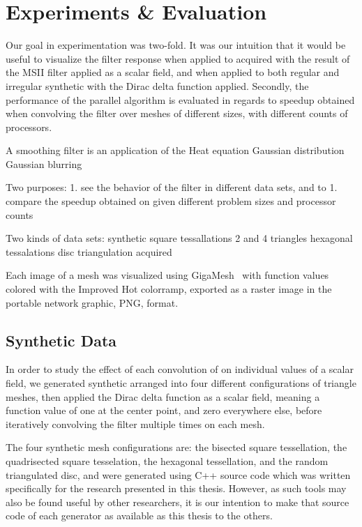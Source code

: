 \chapter{Experiments \& Evaluation}
Our goal in experimentation was two-fold. It was our intuition that it would be useful to visualize the filter response when applied to acquired \tdd{} with the result of the MSII filter applied as a scalar field, and when applied to both regular and irregular synthetic \tdd{} with the Dirac delta function applied. Secondly, the performance of the parallel algorithm is evaluated in regards to speedup obtained when convolving the filter over meshes of different sizes, with different counts of processors.

A smoothing filter is an application of the Heat equation 
Gaussian distribution
Gaussian blurring

Two purposes:
	1. see the behavior of the filter in different data sets, and to
	1. compare the speedup obtained on given different problem sizes and processor counts

Two kinds of data sets:
	synthetic
		square tessallations 2 and 4 triangles
		hexagonal tessalations
		disc triangulation
	acquired

Each image of a mesh was visualized using GigaMesh~\cite{Mara10} with function values colored with the Improved Hot colorramp, exported as a raster image in the portable network graphic, PNG, format.%


%
%
%
%
%
%
\section{Synthetic Data}
In order to study the effect of each convolution of  on individual values of a scalar field, we generated synthetic \tdd{} arranged into four different configurations of triangle meshes, then applied the Dirac delta function as a scalar field, meaning a function value of one at the center point, and zero everywhere else, before iteratively convolving the filter multiple times on each mesh.

The four synthetic mesh configurations are: the bisected square tessellation, the quadrisected square tesselation, the hexagonal tessellation, and the random triangulated disc, and were generated using C++ source code which was written specifically for the research presented in this thesis. However, as such tools may also be found useful by other researchers, it is our intention to make that source code of each generator as available as this thesis to the others.




